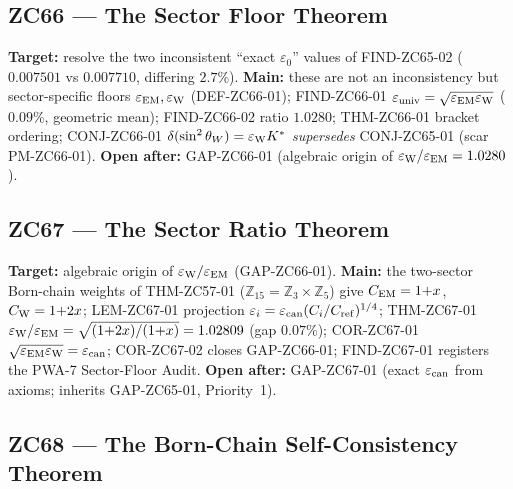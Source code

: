 \documentclass[11pt, a4paper]{article}
\newcommand{\swsq}{\sin^2\theta_W}
\newcommand{\Ztf}{\mathbb{Z}_{15}}
\newcommand{\Zth}{\mathbb{Z}_3}
\newcommand{\Zfi}{\mathbb{Z}_5}
\newcommand{\epscan}{\varepsilon_{\rm can}}
\newcommand{\Kstar}{K^*}
\begin{document}
\subsection{ZC66 --- The Sector Floor Theorem}

\begin{zcbox}[title={ZC66: THM-ZC66-01 --- Sector-Specific Floors}]
\sloppy
\textbf{Target:} resolve the two inconsistent ``exact $\varepsilon_0$''
values of FIND-ZC65-02 ($0.007501$ vs $0.007710$, differing $2.7\%$).
\textbf{Main:} these are not an inconsistency but sector-specific floors
$\varepsilon_{\rm EM}, \varepsilon_{\rm W}$ (DEF-ZC66-01);
FIND-ZC66-01 $\varepsilon_{\rm univ}=\sqrt{\varepsilon_{\rm EM}\varepsilon_{\rm W}}$
($0.09\%$, geometric mean); FIND-ZC66-02 ratio $1.0280$; THM-ZC66-01
bracket ordering; CONJ-ZC66-01 $\delta(\swsq)=\varepsilon_{\rm W}\Kstar$
\emph{supersedes} CONJ-ZC65-01 (scar PM-ZC66-01).
\textbf{Open after:} GAP-ZC66-01 (algebraic origin of $\varepsilon_{\rm W}/\varepsilon_{\rm EM}=1.0280$).
\end{zcbox}

\subsection{ZC67 --- The Sector Ratio Theorem}

\begin{zcbox}[title={ZC67: THM-ZC67-01 --- Sector Ratio (Near-Formal)}]
\sloppy
\textbf{Target:} algebraic origin of $\varepsilon_{\rm W}/\varepsilon_{\rm EM}$
(GAP-ZC66-01). \textbf{Main:} the two-sector Born-chain weights of
THM-ZC57-01 ($\Ztf=\Zth\times\Zfi$) give $C_{\rm EM}=1{+}x$, $C_{\rm W}=1{+}2x$;
LEM-ZC67-01 projection $\varepsilon_i=\epscan(C_i/C_{\rm ref})^{1/4}$;
THM-ZC67-01 $\varepsilon_{\rm W}/\varepsilon_{\rm EM}=\sqrt{(1{+}2x)/(1{+}x)}=1.02809$
(gap $0.07\%$); COR-ZC67-01 $\sqrt{\varepsilon_{\rm EM}\varepsilon_{\rm W}}=\epscan$;
COR-ZC67-02 closes GAP-ZC66-01; FIND-ZC67-01 registers the PWA-7
Sector-Floor Audit. \textbf{Open after:} GAP-ZC67-01 (exact $\epscan$
from axioms; inherits GAP-ZC65-01, Priority~1).
\end{zcbox}

\subsection{ZC68 --- The Born-Chain Self-Consistency Theorem}
\end{document}

